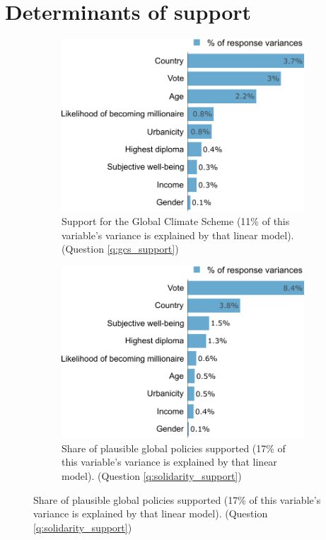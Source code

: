 \section{Determinants of support}\label{app:determinants}


\begin{figure}[h!]\label{fig:lmg}
\caption[Variance decomposition]{Variance decomposition: share of the variance explained by each covariate.}
\begin{subfigure}{.49\textwidth}
  \caption[]{Support for the Global Climate Scheme (11\% of this variable's variance is explained by that linear model). (Question \ref{q:gcs_support})\label{fig:lmg_gcs}}
  \includegraphics[width=\textwidth]{../figures/all/lmg_gcs_support_few.pdf}
\end{subfigure} \quad
\begin{subfigure}{.49\textwidth}
  \caption[]{Share of plausible global policies supported (17\% of this variable's variance is explained by that linear model). (Question \ref{q:solidarity_support})\label{fig:lmg_solidarity}}
  \includegraphics[width=\textwidth]{../figures/all/lmg_share_solidarity_supported_few.pdf}
\end{subfigure}
\end{figure}

